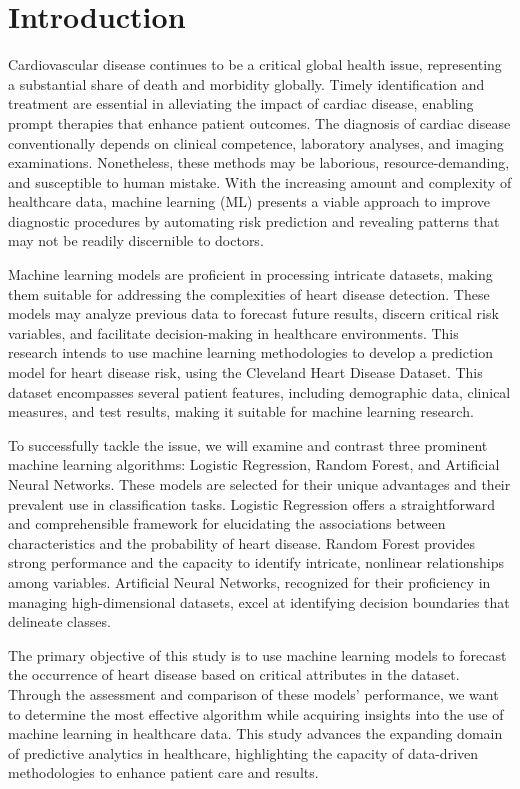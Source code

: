
\section{Introduction}
Cardiovascular disease continues to be a critical global health issue, representing a substantial share of death and morbidity globally. Timely identification and treatment are essential in alleviating the impact of cardiac disease, enabling prompt therapies that enhance patient outcomes. The diagnosis of cardiac disease conventionally depends on clinical competence, laboratory analyses, and imaging examinations. Nonetheless, these methods may be laborious, resource-demanding, and susceptible to human mistake. With the increasing amount and complexity of healthcare data, machine learning (ML) presents a viable approach to improve diagnostic procedures by automating risk prediction and revealing patterns that may not be readily discernible to doctors.

Machine learning models are proficient in processing intricate datasets, making them suitable for addressing the complexities of heart disease detection. These models may analyze previous data to forecast future results, discern critical risk variables, and facilitate decision-making in healthcare environments. This research intends to use machine learning methodologies to develop a prediction model for heart disease risk, using the Cleveland Heart Disease Dataset. This dataset encompasses several patient features, including demographic data, clinical measures, and test results, making it suitable for machine learning research.

To successfully tackle the issue, we will examine and contrast three prominent machine learning algorithms: Logistic Regression, Random Forest, and Artificial Neural Networks. These models are selected for their unique advantages and their prevalent use in classification tasks. Logistic Regression offers a straightforward and comprehensible framework for elucidating the associations between characteristics and the probability of heart disease. Random Forest provides strong performance and the capacity to identify intricate, nonlinear relationships among variables. Artificial Neural Networks, recognized for their proficiency in managing high-dimensional datasets, excel at identifying decision boundaries that delineate classes.

The primary objective of this study is to use machine learning models to forecast the occurrence of heart disease based on critical attributes in the dataset. Through the assessment and comparison of these models' performance, we want to determine the most effective algorithm while acquiring insights into the use of machine learning in healthcare data. This study advances the expanding domain of predictive analytics in healthcare, highlighting the capacity of data-driven methodologies to enhance patient care and results.
